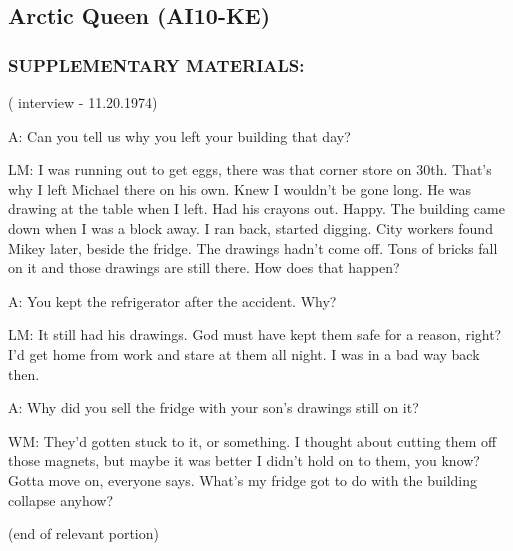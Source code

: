 \subsection*{Arctic Queen (AI10-KE)}
\subsubsection*{SUPPLEMENTARY MATERIALS:}
\par ( interview - 11.20.1974)
\par A: Can you tell us why you left your building that day?
\par LM: I was running out to get eggs, there was that corner store on
30th. That's why I left Michael there on his own. Knew I wouldn't
be gone long. He was drawing at the table when I left. Had his
crayons out. Happy. The building came down when I was a block
away. I ran back, started digging. City workers found Mikey later,
beside the fridge. The drawings hadn't come off. Tons of bricks
fall on it and those drawings are still there. How does that
happen?
\par A: You kept the refrigerator after the accident. Why?
\par LM: It still had his drawings. God must have kept them safe for a
reason, right? I'd get home from work and stare at them all night. I
was in a bad way back then.
\par A: Why did you sell the fridge with your son's drawings still on it?
\par WM: They'd gotten stuck to it, or something. I thought about
cutting them off those magnets, but maybe it was better I didn't
hold on to them, you know? Gotta move on, everyone says.
What's my fridge got to do with the building collapse anyhow?
\par (end of relevant portion)